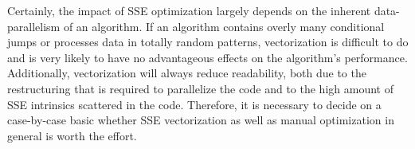 Certainly, the impact of SSE optimization largely depends on the inherent data-parallelism of an algorithm. If an algorithm contains overly many conditional jumps or processes data in totally random patterns, vectorization is difficult to do and is very likely to have no advantageous effects on the algorithm's performance. Additionally, vectorization will always reduce readability, both due to the restructuring that is required to parallelize the code and to the high amount of SSE intrinsics scattered in the code. Therefore, it is necessary to decide on a case-by-case basic whether SSE vectorization as well as manual optimization in general is worth the effort.
